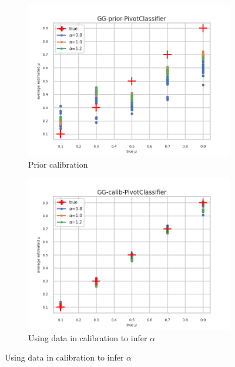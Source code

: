 \begin{figure}[ht!]
  \begin{subfigure}[t]{0.49\linewidth}
    \includegraphics[width=\linewidth]{COMPARE/GG-prior/PivotClassifier/profusion_true_mu_target_mean.png}
    \caption{Prior calibration}
  \end{subfigure}%
  \hfill
  \begin{subfigure}[t]{0.49\linewidth}
    \includegraphics[width=\linewidth]{COMPARE/GG-calib/PivotClassifier/profusion_true_mu_target_mean.png}
    \caption{Using data in calibration to infer $\alpha$}
  \end{subfigure}


\end{figure}
